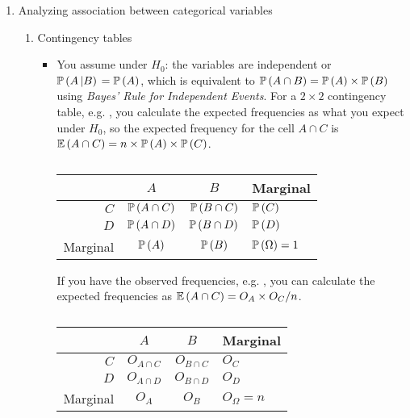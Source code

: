 \begin{enumerate}[label=\textbf{\S~\arabic*}, ref=\S~\arabic*]
    \item Analyzing association between categorical variables
    \begin{enumerate}[label=\textbf{\S~8.\arabic*}, ref=\S~8.\arabic*]
        \item Contingency tables
        \begin{itemize}
            \item You assume under $H_0$: the variables are independent or $\operatorname{\mathbb{P}}{\left( A \left| B \right) \right. } = \operatorname{\mathbb{P}}{\left( A\right)}$, which is equivalent to $\operatorname{\mathbb{P}}{\left( A \cap B\right)} = \operatorname{\mathbb{P}}{\left( A\right)} \times \operatorname{\mathbb{P}}{\left( B\right)}$ using \textit{Bayes' Rule for Independent Events}. For a $2 \times 2$ contingency table, e.g. , you calculate the expected frequencies as what you expect under $H_0$, so the expected frequency for the cell $A \cap C$ is $\operatorname{\mathbb{E}}{\left( A \cap C\right)} = n \times \operatorname{\mathbb{P}}{\left( A\right)} \times \operatorname{\mathbb{P}}{\left( C\right)}$.
            \begin{table}[h]
                \centering
                \begin{tabular}{r|c|c|l}
                    {} & $A$ & $B$ & Marginal \\ \hline
                    $C$ & $\operatorname{\mathbb{P}}{\left( A \cap C\right)}$ & $\operatorname{\mathbb{P}}{\left( B \cap C\right)}$ & $\operatorname{\mathbb{P}}{\left( C\right)}$ \\ \hline
                    $D$ & $\operatorname{\mathbb{P}}{\left( A \cap D\right)}$ & $\operatorname{\mathbb{P}}{\left( B \cap D\right)}$ & $\operatorname{\mathbb{P}}{\left( D\right)}$ \\ \hline
                    Marginal & $\operatorname{\mathbb{P}}{\left( A\right)}$ & $\operatorname{\mathbb{P}}{\left( B\right)}$ & $\operatorname{\mathbb{P}}{\left( \Omega\right)}=1$
                \end{tabular}
                \caption{}
                \label{tab:overview8.1.1}
            \end{table}
            \FloatBarrier
            If you have the observed frequencies, e.g. , you can calculate the expected frequencies as $\operatorname{\mathbb{E}}{\left( A \cap C\right)} = O_{A} \times O_{C}/n$.
            \begin{table}[h]
                \centering
                \begin{tabular}{r|c|c|l}
                    {} & $A$ & $B$ & Marginal \\ \hline
                    $C$ & $O_{A \cap C}$ & $O_{B \cap C}$ & $O_{C}$ \\ \hline
                    $D$ & $O_{A \cap D}$ & $O_{B \cap D}$ & $O_{D}$ \\ \hline
                    Marginal & $O_{A}$ & $O_{B}$ & $O_{\Omega}=n$
                \end{tabular}
                \caption{}
                \label{tab:overview8.1.2}
            \end{table}

\end{itemize}
\end{enumerate}
\end{enumerate}
